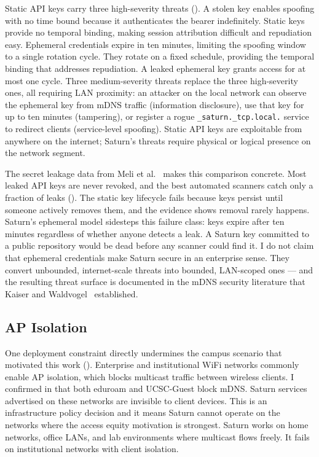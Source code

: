 Static API keys carry three high-severity threats (). A stolen key enables spoofing with no time bound because it authenticates the bearer indefinitely. Static keys provide no temporal binding, making session attribution difficult and repudiation easy. Ephemeral credentials expire in ten minutes, limiting the spoofing window to a single rotation cycle. They rotate on a fixed schedule, providing the temporal binding that addresses repudiation. A leaked ephemeral key grants access for at most one cycle. Three medium-severity threats replace the three high-severity ones, all requiring LAN proximity: an attacker on the local network can observe the ephemeral key from mDNS traffic (information disclosure), use that key for up to ten minutes (tampering), or register a rogue \texttt{\_saturn.\_tcp.local.} service to redirect clients (service-level spoofing). Static API keys are exploitable from anywhere on the internet; Saturn's threats require physical or logical presence on the network segment.

The secret leakage data from Meli et al.~\cite{meli2019secrets} makes this comparison concrete. Most leaked API keys are never revoked, and the best automated scanners catch only a fraction of leaks (). The static key lifecycle fails because keys persist until someone actively removes them, and the evidence shows removal rarely happens. Saturn's ephemeral model sidesteps this failure class: keys expire after ten minutes regardless of whether anyone detects a leak. A Saturn key committed to a public repository would be dead before any scanner could find it. I do not claim that ephemeral credentials make Saturn secure in an enterprise sense. They convert unbounded, internet-scale threats into bounded, LAN-scoped ones --- and the resulting threat surface is documented in the mDNS security literature that Kaiser and Waldvogel~\cite{kaiser2014privacy} established.

\subsection{AP Isolation}

One deployment constraint directly undermines the campus scenario that motivated this work (). Enterprise and institutional WiFi networks commonly enable AP isolation, which blocks multicast traffic between wireless clients. I confirmed in  that both eduroam and UCSC-Guest block mDNS. Saturn services advertised on these networks are invisible to client devices. This is an infrastructure policy decision and it means Saturn cannot operate on the networks where the access equity motivation is strongest. Saturn works on home networks, office LANs, and lab environments where multicast flows freely. It fails on institutional networks with client isolation.

